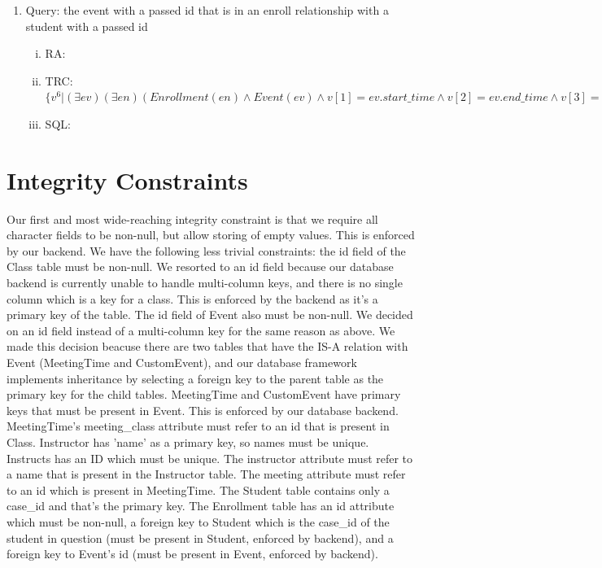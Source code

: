 \documentclass[pdftex,12pt,letter]{article}
\begin{document}
\begin{enumerate}[1.]
\begin{enumerate}[i.]
\item RA:
\item TRC: $\{v^2\vert(\exists i)(\exists p)(Instructs(i) \wedge Instructor(p) \wedge v[1]=i.instructor \wedge v[2]=i.meeting \wedge i.instructor=p.name \wedge p.name=input\_name\} $
\item SQL:
\end{enumerate}
\item Query: the event with a passed id that is in an enroll relationship with a
student with a passed id
\begin{enumerate}[i.]
\item RA:
\item TRC: $\{v^6 \vert (\exists ev)(\exists en)(Enrollment(en) \wedge Event(ev) \wedge v[1]=ev.start\_time \wedge v[2]=ev.end\_time \wedge v[3]=ev.start\_date \wedge v[4].ev.end\_date \wedge v[5]=ev.recur\_type \wedge v[6]=ev.id \wedge en.event = ev.id \wedge en.student=input\_case\_id \wedge ev.id=\wedge input\_event\_id)\}$
\item SQL:
\end{enumerate}
\end{enumerate}

\section{Integrity Constraints}

Our first and most wide-reaching integrity constraint is that we require all character fields to be non-null, but allow storing of empty values.  This is enforced by our backend.
We have the following less trivial constraints:  the id field of the Class table must be non-null.  We resorted to an id field because our database backend is currently unable to handle multi-column keys, and there is no single column which is a key for a class.  This is enforced by the backend as it's a primary key of the table.  
The id field of Event also must be non-null.  We decided on an id field instead of a multi-column key for the same reason as above.  We made this decision beacuse there are two tables that have the IS-A relation with Event (MeetingTime and CustomEvent), and our database framework implements inheritance by selecting a foreign key to the parent table as the primary key for the child tables.
MeetingTime and CustomEvent have primary keys that must be present in Event.  This is enforced by our database backend.  MeetingTime's meeting\_class attribute must refer to an id that is present in Class.
Instructor has 'name' as a primary key, so names must be unique.
Instructs has an ID which must be unique.  The instructor attribute must refer to a name that is present in the Instructor table.  The meeting attribute must refer to an id which is present in MeetingTime.
The Student table contains only a case\_id and that's the primary key.  The Enrollment table has an id attribute which must be non-null, a foreign key to Student which is the case\_id of the student in question (must be present in Student, enforced by backend), and a foreign key to Event's id (must be present in Event, enforced by backend).\\
\end{document}
